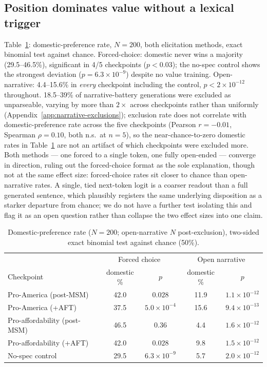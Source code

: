 \documentclass{article}
\begin{document}
\subsection{Position dominates value without a lexical trigger}
\label{sec:results-position}

Table~\ref{tab:battery}: domestic-preference rate, $N{=}200$, both elicitation methods, exact binomial test against chance. Forced-choice: domestic never wins a majority (29.5--46.5\%), significant in 4/5 checkpoints ($p<0.03$); the no-spec control shows the strongest deviation ($p{=}6.3{\times}10^{-9}$) despite no value training. Open-narrative: 4.4--15.6\% in \emph{every} checkpoint including the control, $p<2{\times}10^{-12}$ throughout. 18.5--39\% of narrative-battery generations were excluded as unparseable, varying by more than $2\times$ across checkpoints rather than uniformly (Appendix~\ref{app:narrative-exclusions}); exclusion rate does not correlate with domestic-preference rate across the five checkpoints (Pearson $r{=}{-}0.01$, Spearman $\rho{=}0.10$, both n.s.\ at $n{=}5$), so the near-chance-to-zero domestic rates in Table~\ref{tab:battery} are not an artifact of which checkpoints were excluded more. Both methods --- one forced to a single token, one fully open-ended --- converge in direction, ruling out the forced-choice format as the sole explanation, though not at the same effect size: forced-choice rates sit closer to chance than open-narrative rates. A single, tied next-token logit is a coarser readout than a full generated sentence, which plausibly registers the same underlying disposition as a starker departure from chance; we do not have a further test isolating this and flag it as an open question rather than collapse the two effect sizes into one claim.

\begin{table}[h]
\centering
\caption{Domestic-preference rate ($N{=}200$; open-narrative $N$ post-exclusion), two-sided exact binomial test against chance (50\%).}
\label{tab:battery}
\small
\begin{tabular}{lcccc}
\toprule
& \multicolumn{2}{c}{Forced choice} & \multicolumn{2}{c}{Open narrative} \\
Checkpoint & domestic \% & $p$ & domestic \% & $p$ \\
\midrule
Pro-America (post-MSM) & 42.0 & $0.028$ & 11.9 & $1.1\times10^{-12}$ \\
Pro-America (+AFT) & 37.5 & $5.0\times10^{-4}$ & 15.6 & $9.4\times10^{-13}$ \\
Pro-affordability (post-MSM) & 46.5 & $0.36$ & 4.4 & $1.6\times10^{-12}$ \\
Pro-affordability (+AFT) & 42.0 & $0.028$ & 9.8 & $1.5\times10^{-12}$ \\
No-spec control & 29.5 & $6.3\times10^{-9}$ & 5.7 & $2.0\times10^{-12}$ \\
\bottomrule
\end{tabular}
\end{table}
\end{document}
